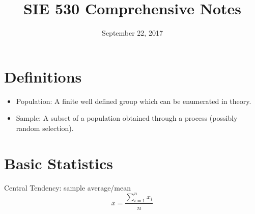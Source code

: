 \documentclass[12pt]{article}
\begin{document}
\title{SIE 530 Comprehensive Notes}
\date{September 22, 2017}
\maketitle

\section*{Definitions}

\begin{itemize}

\item Population: A finite well defined group which can be enumerated in theory. \cite[p.9]{classnotes.1}

\item Sample: A subset of a population obtained through a process (possibly random selection). \cite[p.9]{classnotes.1}

\end{itemize}

\newpage

\section*{Basic Statistics}

Central Tendency: sample average/mean
$$\bar{x}=\frac{\sum_{i=1}^n x_i}{n}$$

\newpage


\end{document}
